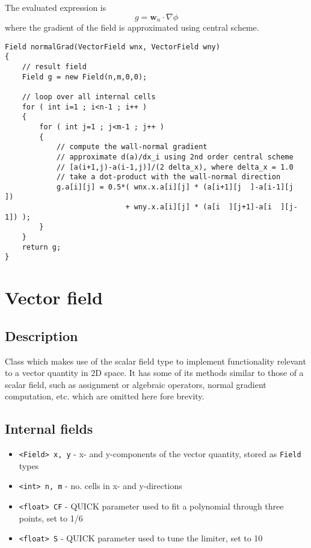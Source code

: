 \documentclass[notitlepage]{article}
\begin{document}
The evaluated expression is
%
\begin{equation}
g = \mathbf{w}_n \cdot \nabla \phi
\end{equation}
%
where the gradient of the field is approximated using central scheme.

\begin{lstlisting}[style=myCpp]
Field normalGrad(VectorField wnx, VectorField wny)
{
	// result field
	Field g = new Field(n,m,0,0);
	
	// loop over all internal cells
	for ( int i=1 ; i<n-1 ; i++ )
	{
		for ( int j=1 ; j<m-1 ; j++ )
		{
			// compute the wall-normal gradient
			// approximate d(a)/dx_i using 2nd order central scheme
			// [a(i+1,j)-a(i-1,j)]/(2 delta_x), where delta_x = 1.0
			// take a dot-product with the wall-normal direction
			g.a[i][j] = 0.5*( wnx.x.a[i][j] * (a[i+1][j  ]-a[i-1][j  ])
							+ wny.x.a[i][j] * (a[i  ][j+1]-a[i  ][j-1]) );
		}
	}
	return g;
}
\end{lstlisting}

\section{Vector field}

\subsection{Description}

Class which makes use of the scalar field type to implement functionality
relevant to a vector quantity in 2D space.
It has some of its methods similar to those of a scalar field, such as assignment
or algebraic operators, normal gradient computation, etc. which are omitted here
fore brevity.

\subsection{Internal fields}

\begin{itemize}
\item \texttt{<Field> x, y} - x- and y-components of the vector quantity, stored
	as \texttt{Field} types
\item \texttt{<int> n, m} - no. cells in x- and y-directions
\item \texttt{<float> CF} - QUICK parameter used to fit a polynomial through three points, set to 1/6 
\item \texttt{<float> S} - QUICK parameter used to tune the limiter, set to 10
\end{itemize}
\end{document}
